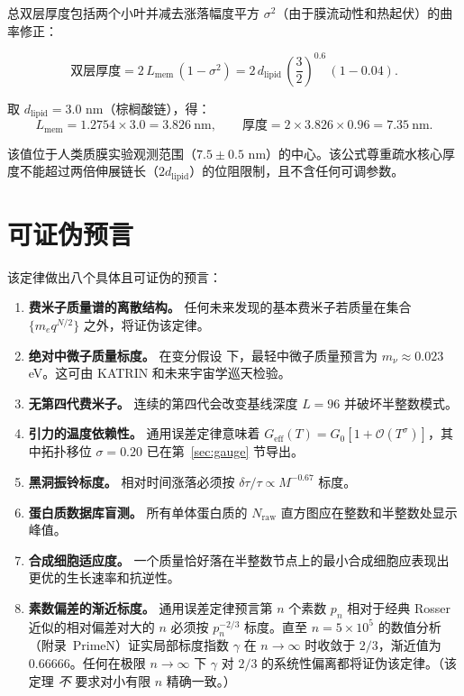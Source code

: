 \documentclass[12pt,a4paper]{article}
\theoremstyle{remark}
\begin{document}
	总双层厚度包括两个小叶并减去涨落幅度平方 \(\sigma^2\)（由于膜流动性和热起伏）的曲率修正：
	
	\begin{equation}
		\boxed{\text{双层厚度} = 2 \, L_{\mathrm{mem}} \,
			(1 - \sigma^2) = 2 \, d_{\mathrm{lipid}} \,
			\left( \frac{3}{2} \right)^{0.6} \, (1 - 0.04)}.
	\end{equation}
	
	取 \(d_{\mathrm{lipid}} = 3.0\) nm（棕榈酸链），得：
	\[
	L_{\mathrm{mem}} = 1.2754 \times 3.0 = 3.826\ \text{nm},
	\qquad
	\text{厚度} = 2 \times 3.826 \times 0.96 = 7.35\ \text{nm}.
	\]
	
	该值位于人类质膜实验观测范围（\(7.5 \pm 0.5\) nm）的中心。该公式尊重疏水核心厚度不能超过两倍伸展链长（\(2 d_{\mathrm{lipid}}\)）的位阻限制，且不含任何可调参数。
	
	\section{可证伪预言}
	\label{sec:predictions}
	
	该定律做出八个具体且可证伪的预言：
	
	\begin{enumerate}[label=(\arabic*)]
		\item \textbf{费米子质量谱的离散结构。} 任何未来发现的基本费米子若质量在集合 \(\{m_e q^{N/2}\}\) 之外，将证伪该定律。
		\item \textbf{绝对中微子质量标度。} 在变分假设 \cite{AppendixLambda} 下，最轻中微子质量预言为 \(m_{\nu} \approx 0.023\) eV。这可由 KATRIN 和未来宇宙学巡天检验。
		\item \textbf{无第四代费米子。} 连续的第四代会改变基线深度 \(L = 96\) 并破坏半整数模式。
		\item \textbf{引力的温度依赖性。} 通用误差定律意味着 \(G_{\mathrm{eff}}(T) = G_0[1 + \mathcal{O}(T^{\sigma})]\)，其中拓扑移位 \(\sigma = 0.20\) 已在第~\ref{sec:gauge} 节导出。
		\item \textbf{黑洞振铃标度。} 相对时间涨落必须按 \(\delta\tau/\tau \propto M^{-0.67}\) 标度。
		\item \textbf{蛋白质数据库盲测。} 所有单体蛋白质的 \(N_{\mathrm{raw}}\) 直方图应在整数和半整数处显示峰值。
		\item \textbf{合成细胞适应度。} 一个质量恰好落在半整数节点上的最小合成细胞应表现出更优的生长速率和抗逆性。
		\item \textbf{素数偏差的渐近标度。} 通用误差定律预言第 \(n\) 个素数 \(p_n\) 相对于经典 Rosser 近似的相对偏差对大的 \(n\) 必须按 \(p_n^{-2/3}\) 标度。直至 \(n = 5\times10^5\) 的数值分析（附录~PrimeN）证实局部标度指数 \(\gamma\) 在 \(n\to\infty\) 时收敛于 \(2/3\)，渐近值为 \(0.66666\)。任何在极限 \(n\to\infty\) 下 \(\gamma\) 对 \(2/3\) 的系统性偏离都将证伪该定律。（该定理 \emph{不} 要求对小有限 \(n\) 精确一致。）
	\end{enumerate}
	
\end{document}
